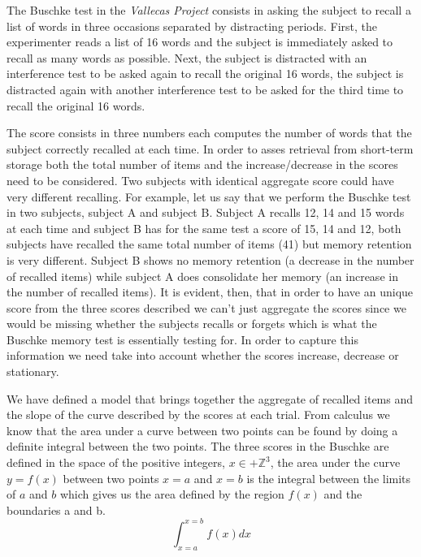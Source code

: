 \documentclass[9pt,twocolumn,twoside]{pnas-new}
\begin{document}
The Buschke test in the \emph{Vallecas Project} consists in asking the subject to recall a list of words in three occasions separated by distracting periods. First, the experimenter reads a list of 16 words and the subject is immediately asked to recall as many words as possible. Next, the subject is distracted with an interference test to be asked again to recall the original 16 words, the subject is distracted again with another interference test to be asked for the third time to recall the original 16 words.

The score consists in three numbers each computes the number of words that the subject correctly recalled at each time. In order to asses retrieval from short-term storage both the total number of items and the increase/decrease in the scores need to be considered. Two subjects with identical aggregate score could have very different recalling. For example, let us say that we perform the Buschke test in two subjects, subject A and subject B. Subject A recalls 12, 14 and 15 words at each time and subject B has for the same test a score of 15, 14 and 12, both subjects have recalled the same total number of items (41) but memory retention is very different. Subject B shows no memory retention (a decrease in the number of recalled items) while subject A does consolidate her memory (an increase in the number of recalled items).
It is evident, then, that in order to have an unique score from the three scores described we can't just aggregate the scores since we would be missing whether the subjects recalls or forgets which is what the Buschke memory test is essentially testing for. In order to capture this information we need take into account whether the scores increase, decrease or stationary.

We have defined a model that brings together the aggregate of recalled items and the slope of the curve described by the scores at each trial. 
From calculus we know that the area under a curve between two points can be found by doing a definite integral between the two points. 
The three scores in the Buschke are defined in the space of the positive integers, $x \in +\mathbb{Z}^3$, the area under the curve $y = f(x)$ between two points $x=a$ and $x=b$ is the integral between the limits of $a$ and $b$ which gives us the area defined by the region $f(x)$ and the boundaries a and b.
\begin{equation}
\int_{x=a}^{x=b}f(x)dx
\label{eq:defint}
\end{equation}
 
\end{document}

